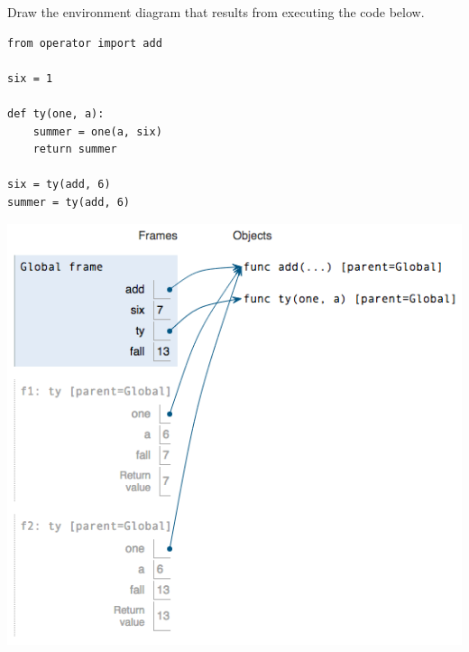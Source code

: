 \question Draw the environment diagram that results from executing the
code below.

\begin{lstlisting}
from operator import add

six = 1

def ty(one, a):
    summer = one(a, six)
    return summer

six = ty(add, 6)
summer = ty(add, 6)
\end{lstlisting}

\begin{solution}[4in]
\begin{center}
\includegraphics[scale=.5]{sixty-one-a-fall.png}
\end{center}
\end{solution}
